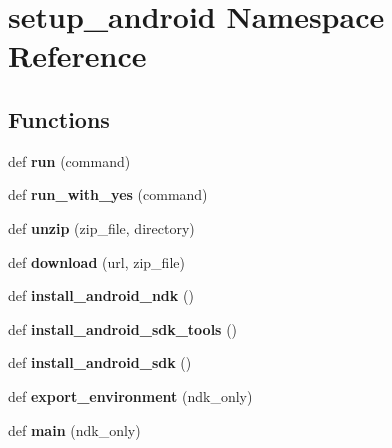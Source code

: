 \hypertarget{namespacesetup__android}{}\section{setup\+\_\+android Namespace Reference}
\label{namespacesetup__android}
\subsection*{Functions}
\begin{DoxyCompactItemize}
\item 
\mbox{\label{namespacesetup__android_ad13b4c931fbd5969727e5c08d400911c}} 
def {\bfseries run} (command)
\item 
\mbox{\label{namespacesetup__android_ab79ac954c44b1ba3e013e2fff72f615d}} 
def {\bfseries run\+\_\+with\+\_\+yes} (command)
\item 
\mbox{\label{namespacesetup__android_ad7d57711ff62c8aebaacf0d4b0b145cd}} 
def {\bfseries unzip} (zip\+\_\+file, directory)
\item 
\mbox{\label{namespacesetup__android_a3533e916e0ad37f4b271113d6d6e8218}} 
def {\bfseries download} (url, zip\+\_\+file)
\item 
\mbox{\label{namespacesetup__android_a7f711eb2ea80cab9d5ef90579826c134}} 
def {\bfseries install\+\_\+android\+\_\+ndk} ()
\item 
\mbox{\label{namespacesetup__android_a0b0f7b7b99afb8f84dd54ae9c21d03b7}} 
def {\bfseries install\+\_\+android\+\_\+sdk\+\_\+tools} ()
\item 
\mbox{\label{namespacesetup__android_a12f7b8495ee635d039e8557c4825d821}} 
def {\bfseries install\+\_\+android\+\_\+sdk} ()
\item 
\mbox{\label{namespacesetup__android_accfb17258f97f44561d09b16728241c3}} 
def {\bfseries export\+\_\+environment} (ndk\+\_\+only)
\item 
\mbox{\label{namespacesetup__android_a3694e8b030a55a73891fff92af0eff3a}} 
def {\bfseries main} (ndk\+\_\+only)
\end{DoxyCompactItemize}
